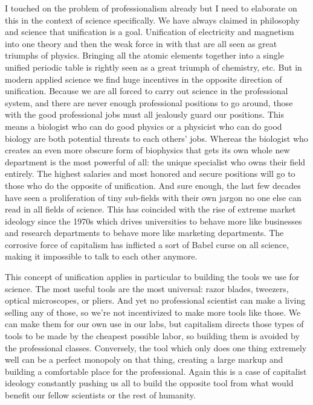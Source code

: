I touched on the problem of professionalism already but I need to
elaborate on this in the context of science specifically. We have always
claimed in philosophy and science that unification is a goal.
Unification of electricity and magnetism into one theory and then the
weak force in with that are all seen as great triumphs of physics.
Bringing all the atomic elements together into a single unified periodic
table is rightly seen as a great triumph of chemistry, etc. But in
modern applied science we find huge incentives in the opposite direction
of unification. Because we are all forced to carry out science in the
professional system, and there are never enough professional positions
to go around, those with the good professional jobs must all jealously
guard our positions. This means a biologist who can do good physics or a
physicist who can do good biology are both potential threats to each
others' jobs. Whereas the biologist who creates an even more obscure
form of biophysics that gets its own whole new department is the most
powerful of all: the unique specialist who owns their field entirely.
The highest salaries and most honored and secure positions will go to
those who do the opposite of unification. And sure enough, the last few
decades have seen a proliferation of tiny sub-fields with their own
jargon no one else can read in all fields of science. This has coincided
with the rise of extreme market ideology since the 1970s which drives
universities to behave more like businesses and research departments to
behave more like marketing departments. The corrosive force of
capitalism has inflicted a sort of Babel curse on all science, making it
impossible to talk to each other anymore.

This concept of unification applies in particular to building the tools
we use for science. The most useful tools are the most universal: razor
blades, tweezers, optical microscopes, or pliers. And yet no
professional scientist can make a living selling any of those, so we're
not incentivized to make more tools like those. We can make them for our
own use in our labs, but capitalism directs those types of tools to be
made by the cheapest possible labor, so building them is avoided by the
professional classes. Conversely, the tool which only does one thing
extremely well can be a perfect monopoly on that thing, creating a large
markup and building a comfortable place for the professional. Again this
is a case of capitalist ideology constantly pushing us all to build the
opposite tool from what would benefit our fellow scientists or the rest
of humanity.

